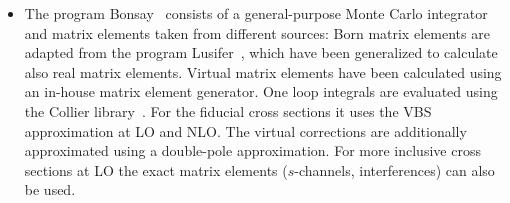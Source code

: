 \documentclass[twocolumn,epjc3]{svjour3} %
\begin{document}
     \begin{itemize} 

    \item The program {\sc Bonsay}~\cite{Dittmaier:2018zzz} consists of a general-purpose Monte Carlo integrator and matrix elements taken from different sources:
    Born matrix elements are adapted from the program {\sc Lusifer}~\cite{Dittmaier:2002ap}, which have been generalized to calculate also real matrix elements.
    Virtual matrix elements have been calculated using an in-house matrix element generator.
    One loop integrals are evaluated using the {\sc Collier} library~\cite{Denner:2014gla,Denner:2016kdg}.
    For the fiducial cross sections it uses the VBS approximation at LO and NLO.
    The virtual corrections are additionally approximated using a double-pole approximation.
    For more inclusive cross sections at LO the exact matrix elements ($s$-channels, interferences) can also be used.


\end{itemize}
\end{document}

